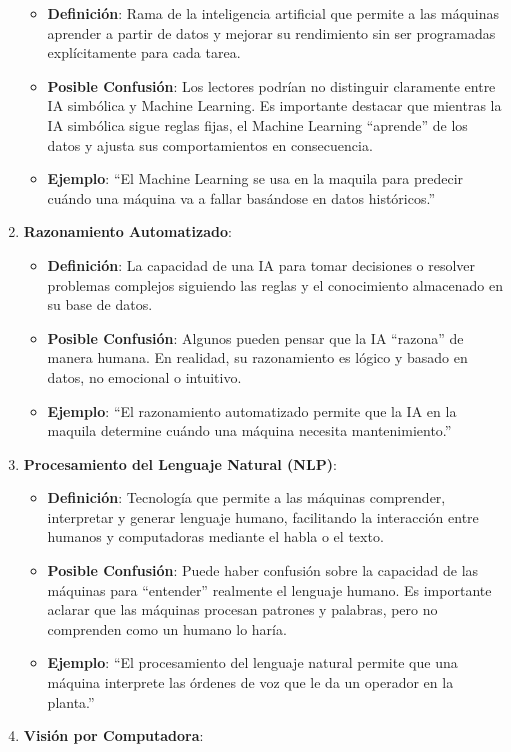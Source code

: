 \documentclass[
  10pt,
  letterpaper,
]{book}
\providecommand{\tightlist}{%
  \setlength{\itemsep}{0pt}\setlength{\parskip}{0pt}}\usepackage{longtable,booktabs,array}
\begin{document}
\begin{enumerate}
  \begin{itemize}
  \tightlist
  \item
    \textbf{Definición}: Rama de la inteligencia artificial que permite
    a las máquinas aprender a partir de datos y mejorar su rendimiento
    sin ser programadas explícitamente para cada tarea.
  \item
    \textbf{Posible Confusión}: Los lectores podrían no distinguir
    claramente entre IA simbólica y Machine Learning. Es importante
    destacar que mientras la IA simbólica sigue reglas fijas, el Machine
    Learning ``aprende'' de los datos y ajusta sus comportamientos en
    consecuencia.
  \item
    \textbf{Ejemplo}: ``El Machine Learning se usa en la maquila para
    predecir cuándo una máquina va a fallar basándose en datos
    históricos.''
  \end{itemize}
\item
  \textbf{Razonamiento Automatizado}:

  \begin{itemize}
  \tightlist
  \item
    \textbf{Definición}: La capacidad de una IA para tomar decisiones o
    resolver problemas complejos siguiendo las reglas y el conocimiento
    almacenado en su base de datos.
  \item
    \textbf{Posible Confusión}: Algunos pueden pensar que la IA
    ``razona'' de manera humana. En realidad, su razonamiento es lógico
    y basado en datos, no emocional o intuitivo.
  \item
    \textbf{Ejemplo}: ``El razonamiento automatizado permite que la IA
    en la maquila determine cuándo una máquina necesita mantenimiento.''
  \end{itemize}
\item
  \textbf{Procesamiento del Lenguaje Natural (NLP)}:

  \begin{itemize}
  \tightlist
  \item
    \textbf{Definición}: Tecnología que permite a las máquinas
    comprender, interpretar y generar lenguaje humano, facilitando la
    interacción entre humanos y computadoras mediante el habla o el
    texto.
  \item
    \textbf{Posible Confusión}: Puede haber confusión sobre la capacidad
    de las máquinas para ``entender'' realmente el lenguaje humano. Es
    importante aclarar que las máquinas procesan patrones y palabras,
    pero no comprenden como un humano lo haría.
  \item
    \textbf{Ejemplo}: ``El procesamiento del lenguaje natural permite
    que una máquina interprete las órdenes de voz que le da un operador
    en la planta.''
  \end{itemize}
\item
  \textbf{Visión por Computadora}:


\end{enumerate}
\end{document}
